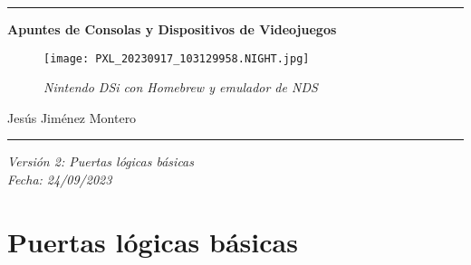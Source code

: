 \documentclass[12pt]{article}
\date{}
\begin{document}
\nocite{atkinson}
\begin{titlepage}
        \begin{center}
             
         
        \hrule
        \vspace{1cm}
        \vspace{1cm}
        {\bfseries\huge Apuntes de Consolas y Dispositivos de Videojuegos \par}
        \vspace{2cm}

        \begin{figure}[H]
            \centering
            \texttt{[image: PXL\_20230917\_103129958.NIGHT.jpg]}
            \caption*{\footnotesize{\textit{Nintendo DSi con Homebrew y emulador de NDS}}}
            \label{fig:dsi}
        \end{figure}
        
        {\large 
        Jesús Jiménez Montero \\
        \par}
        \vspace{1cm}
        \hrule
        \vspace{1cm}

        {\large 
        \textit{Versión 2: Puertas lógicas básicas\\
        Fecha: 24/09/2023}
        \par}
        \end{center}
\end{titlepage}

\newpage
\renewcommand{\contentsname}{Tabla de contenidos}
\setcounter{secnumdepth}{5}
\tableofcontents
\setcounter{tocdepth}{4}

\newpage
\newpage
\renewcommand{\listfigurename}{Lista de figuras}
\thispagestyle{empty}
\listoffigures
\newpage

\renewcommand{\listtablename}{Lista de tablas}
\listoftables
\newpage


\section{Puertas lógicas básicas \cite{floyd_fundamentos_2006}} 
\end{document}
